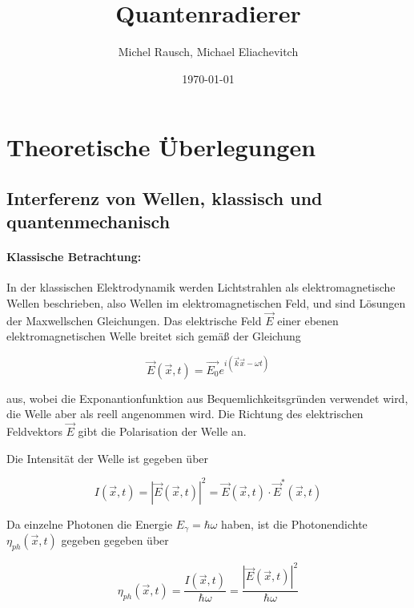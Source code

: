 \documentclass[a4paper,ngerman]{scrartcl}
\title{Quantenradierer}
\date{\today}
\author{Michel Rausch, Michael Eliachevitch}
\begin{document}
\maketitle
\tableofcontents
\thispagestyle{empty} %
\newpage
\setcounter{page}{1}

\section{Theoretische Überlegungen}
\label{sec:theorie}

\subsection{Interferenz von Wellen, klassisch und quantenmechanisch}
\label{sec:interferenz}

\paragraph{Klassische Betrachtung:}
\label{par:klass}
In der klassischen Elektrodynamik werden Lichtstrahlen als elektromagnetische Wellen beschrieben, also Wellen im elektromagnetischen Feld,
und sind Lösungen der Maxwellschen Gleichungen. Das elektrische Feld $\vec{E}$ einer ebenen elektromagnetischen Welle breitet sich gemäß der
Gleichung

\begin{equation}
\vec{E}(\vec{x},t) = \vec{E_0} e^{i(\vec{k}\vec{x}-\omega t)}
\end{equation}

aus, wobei die Exponantionfunktion aus Bequemlichkeitsgründen verwendet wird, die Welle aber
als reell angenommen wird. Die Richtung des elektrischen Feldvektors $\vec{E}$ gibt die Polarisation der Welle an.

Die Intensität der Welle ist gegeben über 

\begin{equation}
I(\vec{x},t) = |\vec{E}(\vec{x},t)|^2 = \vec{E}(\vec{x},t) \cdot \vec{E}^*(\vec{x},t)
\end{equation}

Da einzelne Photonen die Energie $E_\gamma = \hbar \omega$ haben, ist die Photonendichte $\eta_{ph}(\vec{x},t)$ gegeben gegeben über

\begin{equation}
  \eta_{ph}(\vec{x},t) = \frac{I(\vec{x},t)}{\hbar \omega} = \frac{|\vec{E}(\vec{x},t)|^2}{\hbar \omega}
\end{equation}
\end{document}
